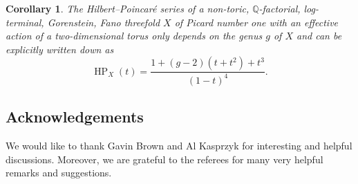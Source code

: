 \documentclass[10pt,a4paper]{amsart}
\newtheorem{coro}[thm]{Corollary}
\theoremstyle{definition}
\def\QQ{{\mathbb Q}}
\DeclareMathOperator\HP{HP}
\numberwithin{equation}{section}
\begin{document}
\begin{coro}
The Hilbert--Poincar\'e series of a non-toric, $\QQ$-factorial,
log-terminal, Gorenstein, Fano threefold $X$ of Picard number
one with an effective action of a two-dimensional torus only depends on the genus $g$
of $X$ and can be explicitly written down as
\[
\HP_X(t) = \frac{1 + (g-2)(t+t^2) + t^3}{(1-t)^4}.
\]
\end{coro}



\subsection*{Acknowledgements}
We would like to thank Gavin Brown and
Al Kasprzyk for interesting and helpful
discussions.
Moreover, we are grateful to the referees
for many very helpful remarks and suggestions.

\end{document}
